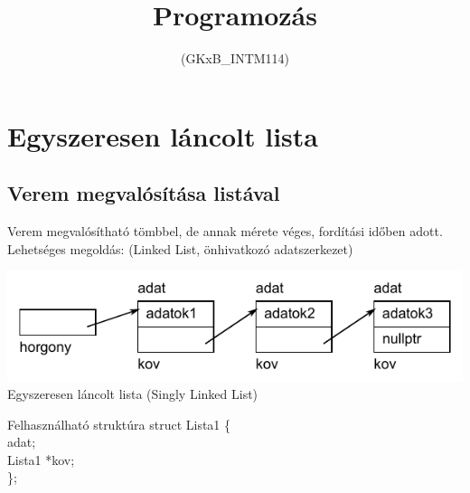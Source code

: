 \documentclass[usenames,dvipsnames,aspectratio=169]{beamer}
\title[11. előadás]{Programozás}
\subtitle{(GKxB\_INTM114)}
\begin{document}
\begin{frame}[plain]
  \titlepage
  \logoalul
\end{frame}

\section{Egyszeresen láncolt lista}
\subsection{Verem megvalósítása listával}
\begin{frame}
  Verem megvalósítható tömbbel, de annak mérete véges, fordítási időben adott.
  Lehetséges megoldás:  (Linked List, önhivatkozó adatszerkezet)
  \begin{center}
    \includegraphics[scale=0.8]{list1.pdf}\\
    \scriptsize
    Egyszeresen láncolt lista (Singly Linked List)
  \end{center}
  \begin{exampleblock}{Felhasználható struktúra}
    \footnotesize
    struct Lista1 \{\\
    \qquad {} adat;\\
    \qquad Lista1 *kov;\\
    \};\\
  \end{exampleblock}
\end{frame}

\begin{frame}
  \scriptsize
  \begin{columns}[T]
      \begin{exampleblock}{}
        \scriptsize
        \vspace{-0.3cm}
        
        \vspace{-0.3cm}
      \end{exampleblock}
      \begin{exampleblock}{}
        \normalsize
        
      \end{exampleblock}
  \end{columns}
\end{frame}
\end{document}
